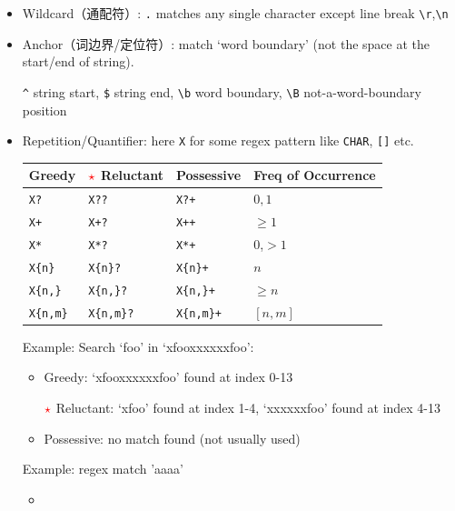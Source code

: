 \begin{itemize}[topsep=2pt,itemsep=0pt]
    \item Wildcard（通配符）: \lstinline|.| matches any single character except line break \lstinline|\r|,\lstinline|\n|
    \item Anchor（词边界/定位符）: match `word boundary' (not the space at the start/end of string).
    
    \lstinline|^| string start, \lstinline|$| string end, \lstinline|\b| word boundary, \lstinline|\B| not-a-word-boundary position
    \item Repetition/Quantifier: here \lstinline|X| for some regex pattern like \lstinline|CHAR|, \lstinline|[]| etc.
    
\begin{table}[H]
    \centering
    \renewcommand\arraystretch{1.15}
    \begin{tabularx}{0.9\linewidth}{XXXX}
        \hline
        Greedy&$ \color{red}\star $ Reluctant&Possessive&Freq of Occurrence\\
        \hline
        \lstinline|X?|&\lstinline|X??|&\lstinline|X?+|& $ 0,1 $\\
        \lstinline|X+|&\lstinline|X+?|&\lstinline|X++|& $ \geq 1 $\\
        \lstinline|X*|&\lstinline|X*?|&\lstinline|X*+|& 0,$ >1 $\\
        \lstinline|X{n}|&\lstinline|X{n}?|&\lstinline|X{n}+|& $ n $\\
        
        \lstinline|X{n,}|&\lstinline|X{n,}?|&\lstinline|X{n,}+|& $ \geq n $\\
        \lstinline|X{n,m}|&\lstinline|X{n,m}?|&\lstinline|X{n,m}+|& $ [n,m] \qquad\qquad  $\\
        \hline
    \end{tabularx}
\end{table}

    Example: Search `foo' in `xfooxxxxxxfoo':
    \begin{itemize}[topsep=2pt,itemsep=0pt]
        \item Greedy: `xfooxxxxxxfoo' found at index 0-13
        \item[$ \color{red}\star $] Reluctant: `xfoo' found at index 1-4, `xxxxxxfoo' found at index 4-13
        \item Possessive: no match found (not usually used)
    \end{itemize}
    
    Example: regex match 'aaaa'
    \begin{itemize}[topsep=2pt,itemsep=0pt]
        \item 
    \end{itemize}
    

\end{itemize}
